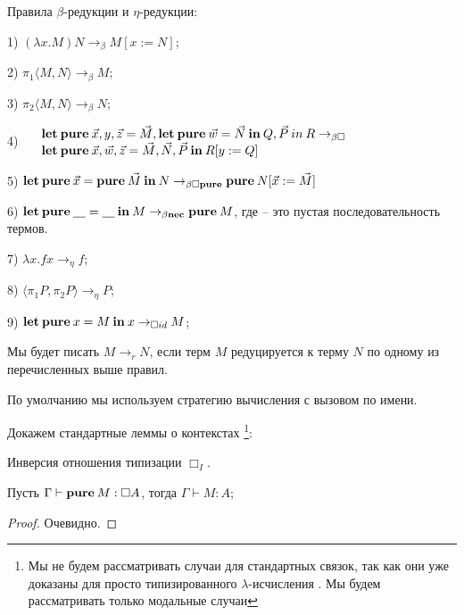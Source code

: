 \begin{defin} Правила $\beta$-редукции и $\eta$-редукции:

1) $(\lambda x. M) N \rightarrow_{\beta} M [x := N]$;

2) $\pi_1 \langle M, N \rangle \rightarrow_{\beta} M$;

3) $\pi_2 \langle M, N \rangle \rightarrow_{\beta} N$;

4) $\begin{array}{lll}
& {\bf let \: pure \:} \vec{x}, y, \vec{z} = \vec{M}, {\bf let \: pure \: } \vec{w} = \vec{N} {\: \bf in \: } Q, \vec{P} {\: in \:} R \rightarrow_{\beta \Box} & \\
& {\bf let \: pure \:} \vec{x}, \vec{w}, \vec{z} = \vec{M}, \vec{N}, \vec{P} {\: \bf in \: } R [y := Q]
\end{array}$

5) ${\bf let \: pure \:} \vec{x} = {\bf pure \:} \vec{M} {\: \bf in \:} N \rightarrow_{\beta \Box {\bf pure}} {\bf pure \:} N [\vec{x} := \vec{M}]$

6) ${\bf let \: pure \:} \underline{\quad} = \underline{\quad} {\: \bf in \:} M \rightarrow_{\beta {\bf nec}} {\bf pure \:} M$, где \underline{\quad} -- это пустая последовательность термов.

7) $\lambda x. f x \rightarrow_{\eta} f$;

8) $\langle \pi_1 P, \pi_2 P \rangle \rightarrow_{\eta} P$;

9) ${\bf let \: pure \:} x = M {\: \bf in \: } x \rightarrow_{\Box id} M$;

\end{defin}

Мы будет писать $M \rightarrow_{r} N$, если терм $M$ редуцируется к терму $N$ по одному из перечисленных выше правил.

По умолчанию мы используем стратегию вычисления с вызовом по имени.

Докажем стандартные леммы о контекстах \footnote{Мы не будем рассматривать случаи для стандартных связок, так как они уже доказаны для просто типизированного $\lambda$-исчисления \cite{Neder} \cite{Morten}. Мы будем рассматривать только модальные случаи}:

\begin{lemma} Инверсия отношения типизации ${\Box}_I$.

Пусть $\Gamma \vdash {\bf pure \:} M : \Box A$, тогда $\Gamma \vdash M : A$;
\end{lemma}

\begin{proof}
Очевидно.
\end{proof}


